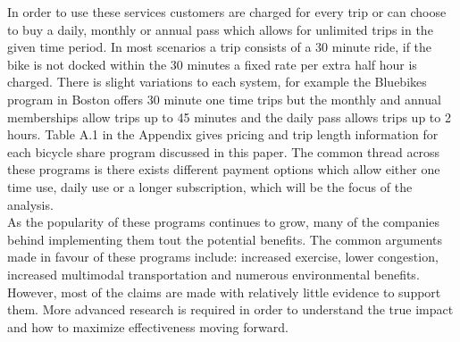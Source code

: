 \documentclass[12pt,letter paper]{article}
\begin{document}
In order to use these services customers are charged for every trip or can choose to buy a daily, monthly or annual pass which allows for unlimited trips in the given time period.  In most scenarios a trip consists of a 30 minute ride, if the bike is not docked within the 30 minutes a fixed rate per extra half hour is charged.  There is slight variations to each system, for example the Bluebikes program in Boston offers 30 minute one time trips but the monthly and annual memberships allow trips up to 45 minutes and the daily pass allows trips up to 2 hours.  Table A.1 in the Appendix gives pricing and trip length information for each bicycle share program discussed in this paper.  The common thread across these programs is there exists different payment options which allow either one time use, daily use or a longer subscription, which will be the focus of the analysis. \\



As the popularity of these programs continues to grow, many of the companies behind implementing them tout the potential benefits.  The common arguments made in favour of these programs include: increased exercise, lower congestion, increased multimodal transportation and numerous environmental benefits.  However, most of the claims are made with relatively little evidence to support them.  More advanced research is required in order to understand the true impact and how to maximize effectiveness moving forward. \\
\end{document}
